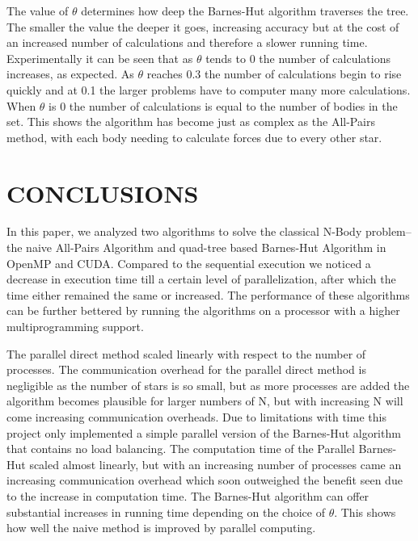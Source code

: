 \documentclass[letterpaper, 10 pt, conference]{ieeeconf}
\begin{document}
    The value of $\theta$ determines how deep the Barnes-Hut algorithm traverses the tree. The smaller the value the deeper it goes, increasing accuracy but at the cost of an increased number of calculations and therefore a slower running time. Experimentally it can be seen that as $\theta$ tends to 0 the number of calculations increases, as expected. As $\theta$ reaches 0.3 the number of calculations begin to rise quickly and at 0.1 the larger problems have to computer many more calculations. When $\theta$ is 0 the number of calculations is equal to the number of bodies in the set. This shows the algorithm has become just as complex as the All-Pairs method, with each body needing to calculate forces due to every other star.


    \section{CONCLUSIONS}

    In this paper, we analyzed two algorithms to solve the classical N-Body problem{--} the naive All-Pairs Algorithm and quad-tree based Barnes-Hut Algorithm in OpenMP and CUDA. Compared to the sequential execution we noticed a decrease in execution time till a certain level of parallelization, after which the time either remained the same or increased. The performance of these algorithms can be further bettered by running the algorithms on a processor with a higher multiprogramming support. \par

    The parallel direct method scaled linearly with respect to the number of processes. The communication overhead for the parallel direct method is negligible as the number of stars is so small, but as more processes are added the algorithm becomes plausible for larger numbers of N, but with increasing N will come increasing communication overheads. Due to limitations with time this project only implemented a simple parallel version of the Barnes-Hut algorithm that contains no load balancing. The computation time of the Parallel Barnes-Hut scaled almost linearly, but with an increasing number of processes came an increasing communication overhead which soon outweighed the benefit seen due to the increase in computation time. The Barnes-Hut algorithm can offer substantial increases in running time depending on the choice of $\theta$. This shows how well the naive method is improved by parallel computing.


    \addtolength{\textheight}{-12cm}   %
\end{document}

